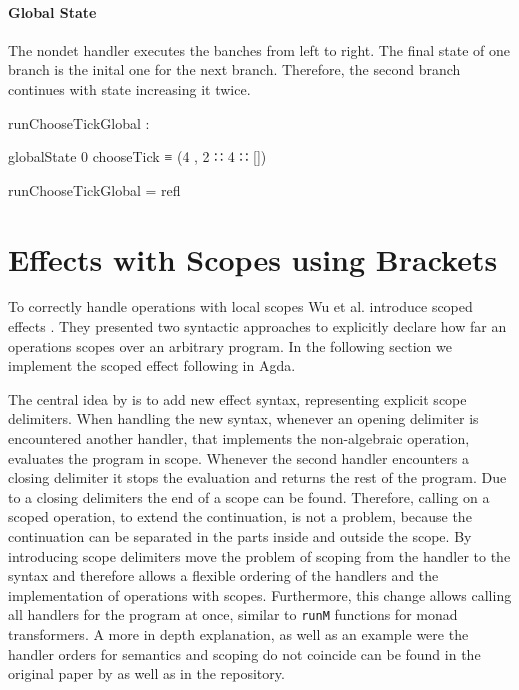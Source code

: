\paragraph{Global State}
The nondet handler executes the banches from left to right.
The final state of one branch is the inital one for the next branch.
Therefore, the second branch continues with state  increasing it
twice.

\begin{center}
\begin{code}
runChooseTickGlobal :
\end{code}
\begin{code}[inline]
 globalState 0 chooseTick ≡ (4 , 2 ∷ 4 ∷ [])
\end{code}
\begin{code}
runChooseTickGlobal = refl
\end{code}
\end{center}


\section{Effects with Scopes using Brackets}
\label{fist-order:scoped-effects}

To correctly handle operations with local scopes Wu et al. introduce scoped
effects \cite{DBLP:conf/haskell/WuSH14}.
They presented two syntactic approaches to explicitly declare how far an
operations scopes over an arbitrary program.
In the following section we implement the scoped effect
 following \textcite{DBLP:conf/haskell/WuSH14} in Agda.

The central idea by \textcite{DBLP:conf/haskell/WuSH14} is to add new effect
syntax, representing explicit scope delimiters.
When handling the new syntax, whenever an opening delimiter is encountered
another handler, that implements the non-algebraic operation, evaluates the
program in scope.
Whenever the second handler encounters a closing delimiter it stops the
evaluation and returns the rest of the program.
Due to a closing delimiters the end of a scope can be found.
Therefore, calling \AgdaFunction{>>=} on a scoped operation, to extend the
continuation, is not a problem, because the continuation can be separated in the
parts inside and outside the scope.
By introducing scope delimiters \textcite{DBLP:conf/haskell/WuSH14} move the
problem of scoping from the handler to the syntax and therefore allows a flexible
ordering of the handlers and the implementation of operations with scopes.
Furthermore, this change allows calling all handlers for the program at once,
similar to \texttt{runM} functions for monad transformers.
A more in depth explanation, as well as an example were the handler orders for
semantics and scoping do not coincide can be found in the original paper by
\textcite{DBLP:conf/haskell/WuSH14} as well as in the repository.


